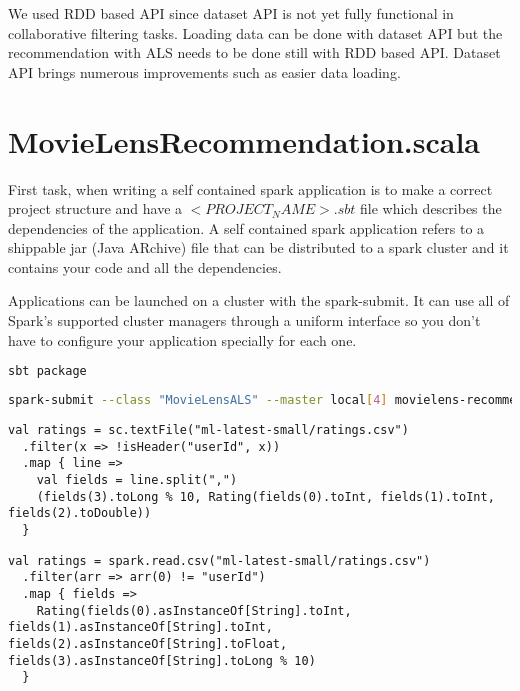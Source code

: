 \documentclass[main.tex]{thesis.tex}
\begin{document}
We used RDD based API since dataset API is not yet fully functional in collaborative filtering tasks.
Loading data can be done with dataset API but the recommendation with ALS needs to be done still with RDD based API. Dataset API brings numerous improvements such as easier data loading.

\section{MovieLensRecommendation.scala}

First task, when writing a self contained spark application is to make a correct project structure and have a $<PROJECT_NAME>.sbt$ file which describes the dependencies of the application. A self contained spark application refers to a shippable jar (Java ARchive) file that can be distributed to a spark cluster and it contains your code and all the dependencies.

Applications can be launched on a cluster with the spark-submit. It can use all of Spark's supported cluster managers through a uniform interface so you don't have to configure your application specially for each one.

\begin{lstlisting}[caption=Creating assembly jar with sbt,language=sh]
sbt package
\end{lstlisting}

\begin{lstlisting}[caption=Launch an application on a cluster,language=sh]
spark-submit --class "MovieLensALS" --master local[4] movielens-recommendations_2.11-1.0.jar
\end{lstlisting}

\begin{lstlisting}[caption=Loading ratings with RDD API]
val ratings = sc.textFile("ml-latest-small/ratings.csv")
  .filter(x => !isHeader("userId", x))
  .map { line =>
    val fields = line.split(",")
    (fields(3).toLong % 10, Rating(fields(0).toInt, fields(1).toInt, fields(2).toDouble))
  }
\end{lstlisting}

\begin{lstlisting}[caption=Loading ratings with Dataset API]
val ratings = spark.read.csv("ml-latest-small/ratings.csv")
  .filter(arr => arr(0) != "userId")
  .map { fields =>
   	Rating(fields(0).asInstanceOf[String].toInt, fields(1).asInstanceOf[String].toInt, fields(2).asInstanceOf[String].toFloat, fields(3).asInstanceOf[String].toLong % 10)
  }
\end{lstlisting}
\end{document}
